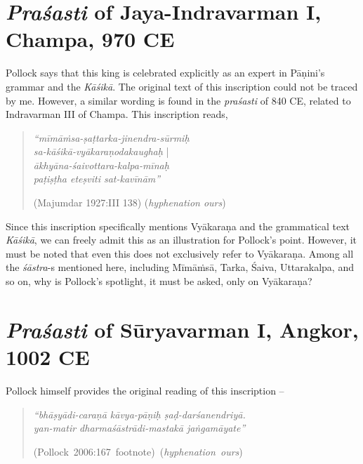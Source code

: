 \section{{\sl\bfseries Praśasti} of Jaya-Indravarman I, Champa, 970 CE}\label{chap3-sec5}

Pollock says that this king is celebrated explicitly as an expert in Pāṇini's grammar and the {\sl Kāśikā}.  The original text of this inscription could not be traced by me. However, a similar wording is found in the {\sl praśasti} of 840 CE, related to Indravarman III of Champa. This inscription reads, 
\begin{quote}
{{\sl ``mīmāṁsa-ṣaṭtarka-jinendra-sūrmiḥ}}\\
\phantom{\quad} {{\sl sa-kāśikā-vyākaraṇodakaughaḥ}} |\\
{{\sl ākhyāna-śaivottara-kalpa-mīnaḥ}}\\
\phantom{\quad} {{\sl paṭiṣṭha eteṣviti sat-kavīnām''}}

\hfill (Majumdar 1927:III 138) ({\sl hyphenation ours})
\end{quote}

Since this inscription specifically mentions Vyākaraṇa and the grammatical text {\sl Kāśikā},  we can freely admit this as an illustration for Pollock's point. However, it must be noted that even this does not exclusively refer to Vyākaraṇa. Among all the {\sl śāstra}-s mentioned here, including Mīmāṁsā, Tarka, Śaiva, Uttarakalpa, and so on, why is Pollock's spotlight, it must be asked, only on Vyākaraṇa?

\section{{\sl\bfseries Praśasti} of Sūryavarman I, Angkor, 1002 CE}\label{chap3-sec6}

Pollock himself provides the original reading of this inscription --
\begin{quote}
{{\sl ``bhāṣyādi-caraṇā kāvya-pāṇiḥ ṣaḍ-darśanendriyā.}}\\
{{\sl yan-matir dharmaśāstrādi-mastakā jaṅgamāyate''}}

\hfill \hbox{(Pollock 2006:167 footnote) ({\sl hyphenation ours})}
\end{quote}

